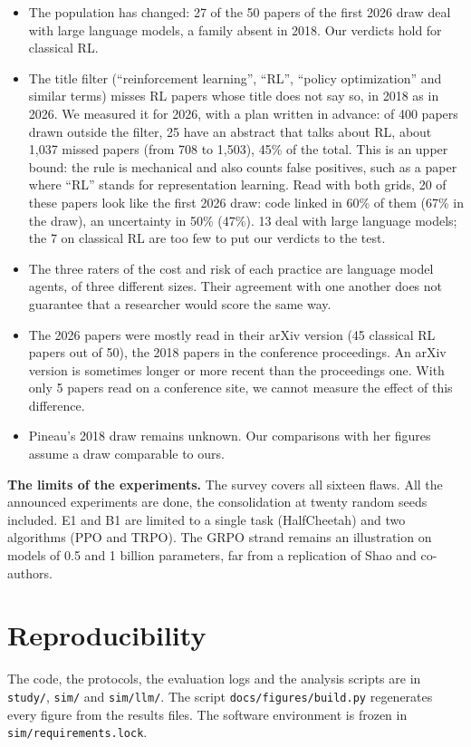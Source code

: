\documentclass[11pt,a4paper]{article}
\begin{document}
\begin{itemize}
  With 50 papers on each side, a change of ten points can still go
  unnoticed.
\item
  The population has changed: 27 of the 50 papers of the first 2026 draw
  deal with large language models, a family absent in 2018. Our verdicts
  hold for classical RL.
\item
  The title filter (``reinforcement learning'', ``RL'', ``policy
  optimization'' and similar terms) misses RL papers whose title does
  not say so, in 2018 as in 2026. We measured it for 2026, with a plan
  written in advance: of 400 papers drawn outside the filter, 25 have an
  abstract that talks about RL, about 1,037 missed papers (from 708 to
  1,503), 45\% of the total. This is an upper bound: the rule is
  mechanical and also counts false positives, such as a paper where
  ``RL'' stands for representation learning. Read with both grids, 20 of
  these papers look like the first 2026 draw: code linked in 60\% of
  them (67\% in the draw), an uncertainty in 50\% (47\%). 13 deal with
  large language models; the 7 on classical RL are too few to put our
  verdicts to the test.
\item
  The three raters of the cost and risk of each practice are language
  model agents, of three different sizes. Their agreement with one
  another does not guarantee that a researcher would score the same way.
\item
  The 2026 papers were mostly read in their arXiv version (45 classical
  RL papers out of 50), the 2018 papers in the conference proceedings.
  An arXiv version is sometimes longer or more recent than the
  proceedings one. With only 5 papers read on a conference site, we
  cannot measure the effect of this difference.
\item
  Pineau's 2018 draw remains unknown. Our comparisons with her figures
  assume a draw comparable to ours.
\end{itemize}

\textbf{The limits of the experiments.} The survey covers all sixteen
flaws. All the announced experiments are done, the consolidation at
twenty random seeds included. E1 and B1 are limited to a single task
(HalfCheetah) and two algorithms (PPO and TRPO). The GRPO strand remains
an illustration on models of 0.5 and 1 billion parameters, far from a
replication of Shao and co-authors.

\section{Reproducibility}\label{reproducibility}

The code, the protocols, the evaluation logs and the analysis scripts
are in \texttt{study/}, \texttt{sim/} and \texttt{sim/llm/}. The script
\texttt{docs/figures/build.py} regenerates every figure from the results
files. The software environment is frozen in
\texttt{sim/requirements.lock}.

\printbibliography[title={References}]
\end{document}

